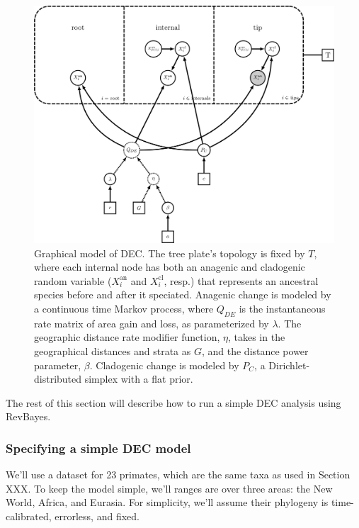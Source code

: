\begin{figure}[H]
\centering
\includegraphics[width=5in]{figures/bg_dec_dag}
\caption{Graphical model of DEC. The tree plate's topology is fixed by $T$, where each internal node has both an anagenic and cladogenic random variable ($X_i^{\text{an}}$ and $X_i^{\text{cl}}$, resp.) that represents an ancestral species before and after it speciated. Anagenic change is modeled by a continuous time Markov process, where $Q_{DE}$ is the instantaneous rate matrix of area gain and loss, as parameterized by $\lambda$. The geographic distance rate modifier function, $\eta$, takes in the geographical distances and strata as $G$, and the distance power parameter, $\beta$. Cladogenic change is modeled by $P_C$, a Dirichlet-distributed simplex with a flat prior.}
\end{figure}

The rest of this section will describe how to run a simple DEC analysis using RevBayes.

\newpage


\subsubsection{Specifying a simple DEC model}

We'll use a dataset for 23 primates, which are the same taxa as used in Section XXX. To keep the model simple, we'll ranges are over three areas: the New World, Africa, and Eurasia.
For simplicity, we'll assume their phylogeny is time-calibrated, errorless, and fixed.

